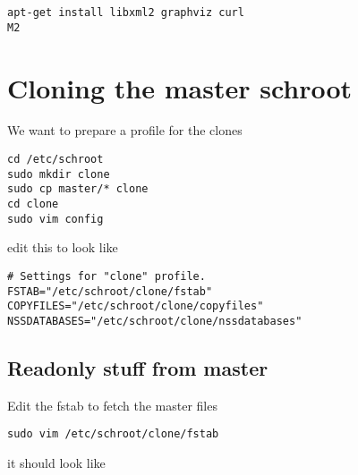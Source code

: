 \documentclass[a4paper]{article}
\begin{document}
\begin{verbatim}
apt-get install libxml2 graphviz curl
M2
\end{verbatim}

\section{Cloning the master schroot}

We want to prepare a profile for the clones

\begin{verbatim}
cd /etc/schroot
sudo mkdir clone
sudo cp master/* clone
cd clone
sudo vim config
\end{verbatim}

edit this to look like

\begin{verbatim}
# Settings for "clone" profile.
FSTAB="/etc/schroot/clone/fstab"
COPYFILES="/etc/schroot/clone/copyfiles"
NSSDATABASES="/etc/schroot/clone/nssdatabases"
\end{verbatim}

\subsection{Readonly stuff from master}

Edit the fstab to fetch the master files

\begin{verbatim}
sudo vim /etc/schroot/clone/fstab
\end{verbatim}

it should look like
\end{document}
